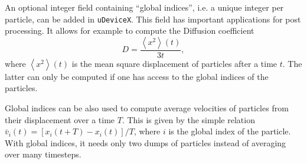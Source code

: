 An optional integer field containing ``global indices'', i.e. a unique integer per particle, can be added in \texttt{uDeviceX}. This field has important applications for post processing. It allows for example to compute the Diffusion coefficient
\[
D = \frac{\left< x^2 \right>(t)}{3 t},
\]
where $\left< x^2 \right>(t)$ is the mean square displacement of particles after a time $t$. The latter can only be computed if one has access to the global indices of the particles.

Global indices can be also used to compute average velocities of particles from their displacement over a time $T$. This is given by the simple relation $\bar{v}_i(t) = [x_i(t + T) - x_i(t)] / T$, where $i$ is the global index of the particle. With global indices, it needs only two dumps of particles instead of averaging over many timesteps.
